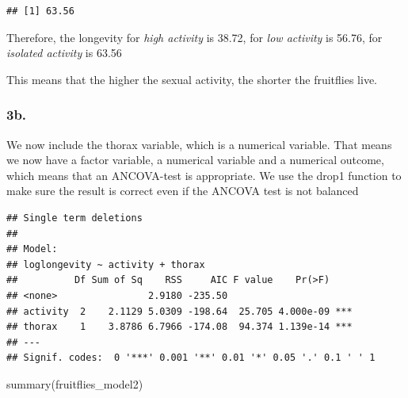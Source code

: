 \documentclass[
]{article}
\newenvironment{Shaded}{\begin{snugshade}}{\end{snugshade}}
\newcommand{\AttributeTok}[1]{\textcolor[rgb]{0.77,0.63,0.00}{#1}}
\newcommand{\FunctionTok}[1]{\textcolor[rgb]{0.00,0.00,0.00}{#1}}
\newcommand{\NormalTok}[1]{#1}
\newcommand{\OtherTok}[1]{\textcolor[rgb]{0.56,0.35,0.01}{#1}}
\newcommand{\SpecialCharTok}[1]{\textcolor[rgb]{0.00,0.00,0.00}{#1}}
\newcommand{\StringTok}[1]{\textcolor[rgb]{0.31,0.60,0.02}{#1}}
\begin{document}
\begin{verbatim}
## [1] 63.56
\end{verbatim}

Therefore, the longevity for \emph{high activity} is 38.72, for
\emph{low activity} is 56.76, for \emph{isolated activity} is 63.56

This means that the higher the sexual activity, the shorter the
fruitflies live.

\hypertarget{b.-1}{%
\subsubsection{3b.}\label{b.-1}}

We now include the thorax variable, which is a numerical variable. That
means we now have a factor variable, a numerical variable and a
numerical outcome, which means that an ANCOVA-test is appropriate. We
use the drop1 function to make sure the result is correct even if the
ANCOVA test is not balanced

\begin{Shaded}
\end{Shaded}

\begin{verbatim}
## Single term deletions
## 
## Model:
## loglongevity ~ activity + thorax
##          Df Sum of Sq    RSS     AIC F value    Pr(>F)    
## <none>                2.9180 -235.50                      
## activity  2    2.1129 5.0309 -198.64  25.705 4.000e-09 ***
## thorax    1    3.8786 6.7966 -174.08  94.374 1.139e-14 ***
## ---
## Signif. codes:  0 '***' 0.001 '**' 0.01 '*' 0.05 '.' 0.1 ' ' 1
\end{verbatim}

\begin{Shaded}
\begin{Highlighting}[]
\FunctionTok{summary}\NormalTok{(fruitflies\_model2)}
\end{Highlighting}
\end{Shaded}
\end{document}
